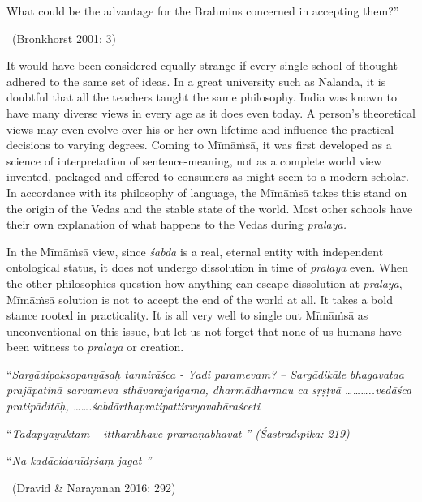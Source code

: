\begin{myquote}
What could be the advantage for the Brahmins concerned in accepting them?” 

~\hfill (Bronkhorst 2001: 3)
\end{myquote}

It would have been considered equally strange if every single school of thought adhered to the same set of ideas. In a great university such as Nalanda, it is doubtful that all the teachers taught the same philosophy. India was known to have many diverse views in every age as it does even today. A person’s theoretical views may even evolve over his or her own lifetime and influence the practical decisions to varying degrees. Coming to Mīmāṁsā, it was first developed as a science of interpretation of sentence-meaning, not as a complete world view invented, packaged and offered to consumers as might seem to a modern scholar. In accordance with its philosophy of language, the Mīmāṁsā takes this stand on the origin of the Vedas and the stable state of the world. Most other schools have their own explanation of what happens to the Vedas during \textit{pralaya.}

In the Mīmāṁsā view, since \textit{śabda} is a real, eternal entity with independent ontological status, it does not undergo dissolution in time of \textit{pralaya} even. When the other philosophies question how anything can escape dissolution at \textit{pralaya}, Mīmāṁsā solution is not to accept the end of the world at all. It takes a bold stance rooted in practicality. It is all very well to single out Mīmāṁsā as unconventional on this issue, but let us not forget that none of us humans have been witness to \textit{pralaya} or creation.

\begin{myquote}
“\textit{Sargādipakṣopanyāsaḥ tannirāśca  - Yadi paramevam? – Sargādikāle bhagavataa prajāpatinā sarvameva sthāvarajańgama, dharmādharmau ca sŗṣṭvā ………..vedāśca pratipāditāḥ, …….śabdārthapratipattirvyavahāraśceti }
\end{myquote}

\begin{myquote}
“\textit{Tadapyayuktam – itthambhāve pramāṇābhāvāt ” (Śāstradīpikā: 219)}
\end{myquote}

\begin{myquote}
“\textit{Na kadācidanīdṛśaṃ jagat ”}

~\hfill (Dravid \& Narayanan 2016: 292)
\end{myquote}

